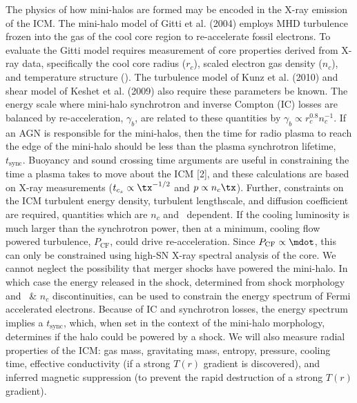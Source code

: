 \documentclass[letterpaper,11pt]{article}
\begin{document}
 The physics of how
mini-halos are formed may be encoded in the X-ray emission of the ICM. The mini-halo
model of Gitti et al. (2004) employs MHD turbulence frozen into the
gas of the cool core region to re-accelerate fossil electrons. To
evaluate the Gitti model requires measurement of core properties
derived from X-ray data, specifically the cool core radius ($r_c$),
scaled electron gas density ($n_c$), and temperature structure
(\tx). The turbulence model of Kunz et al. (2010) and shear model of
Keshet et al. (2009) also require these parameters be known. The
energy scale where mini-halo synchrotron and inverse Compton (IC) losses are
balanced by re-acceleration, $\gamma_b$, are related to these
quantities by $\gamma_b \propto r_c^{0.8} n_c^{-1}$. If an AGN is
responsible for the mini-halos, then the time for radio plasma to reach the
edge of the mini-halo should be less than the plasma synchrotron lifetime,
$t_{\mathrm{sync}}$. Buoyancy and sound crossing time arguments are
useful in constraining the time a plasma takes to move about the ICM
[2], and these calculations are based on X-ray measurements ($t_{c_s}
\propto \tx^{-1/2}$ and $p \propto n_c \tx$). Further, constraints on
the ICM turbulent energy density, turbulent lengthscale, and diffusion
coefficient are required, quantities which are $n_c$ and
\tx\ dependent. If the cooling luminosity is much larger than the
synchrotron power, then at a minimum, cooling flow powered turbulence,
$P_{\mathrm{CF}}$, could drive re-acceleration. Since $P_{\mathrm{CF}}
\propto \mdot$, this can only be constrained using high-SN X-ray
spectral analysis of the core. We cannot neglect the possibility that
merger shocks have powered the mini-halo. In which case the energy released
in the shock, determined from shock morphology and \tx\ \& $n_c$
discontinuities, can be used to constrain the energy spectrum of Fermi
accelerated electrons. Because of IC and synchrotron losses, the
energy spectrum implies a $t_{\mathrm{sync}}$, which, when set in the
context of the mini-halo morphology, determines if the halo could be powered
by a shock. We will also measure radial properties of the ICM: gas
mass, gravitating mass, entropy, pressure, cooling time, effective
conductivity (if a strong $T(r)$ gradient is discovered), and inferred
magnetic suppression (to prevent the rapid destruction of a strong
$T(r)$ gradient).\\
\end{document}
